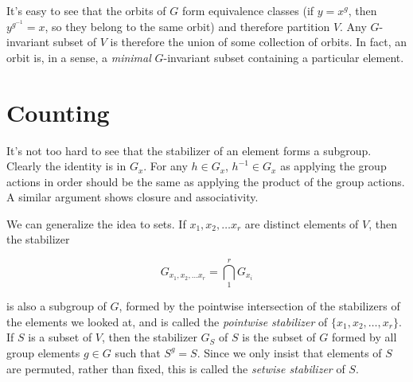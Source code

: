 

It's easy to see that the orbits of $G$ form equivalence classes (if $y=x^g$, then $y^{g^{-1}}=x$, so they belong to the same orbit) and therefore partition $V$.  Any $G$-invariant subset of $V$ is therefore the union of some collection of orbits.  In fact, an orbit is, in a sense, a \textit{minimal} $G$-invariant subset containing a particular element.

\section*{Counting}


It's not too hard to see that the stabilizer of an element forms a subgroup.  Clearly the identity is in $G_x$.  For any $h\in G_x$, $h^{-1}\in G_x$ as applying the group actions in order should be the same as applying the product of the group actions.  A similar argument shows closure and associativity.

We can generalize the idea to sets.  If $x_1,x_2,\dots x_r$ are distinct elements of $V$, then the stabilizer 

$$G_{x_1,x_2,\dots x_r} = \bigcap\limits_{1}^r G_{x_i}$$

is also a subgroup of $G$, formed by the pointwise intersection of the stabilizers of the elements we looked at, and is called the \textit{pointwise stabilizer} of $\{x_1,x_2,\dots,x_r\}$.  If $S$ is a subset of $V$, then the stabilizer $G_S$ of $S$ is the subset of $G$ formed by all group elements $g\in G$ such that $S^g=S$.  Since we only insist that elements of $S$ are permuted, rather than fixed, this is called the \textit{setwise stabilizer} of $S$.

